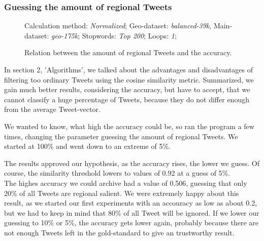 \documentclass[../Main.tex]{subfiles}
\begin{document}
\subsubsection{Guessing the amount of regional Tweets}
\begin{figure}
Calculation method: \textit{Normalized}; Geo-dataset: \textit{balanced-39k}, Main-dataset: \textit{geo-175k}; Stopwords: \textit{Top 200}; Loops: \textit{1}; 

  \caption{Relation between the amount of regional Tweets and the accuracy.}
  \label{geo_graph2}
\end{figure}
In section 2, 'Algorithms', we talked about the advantages and disadvantages of filtering too ordinary Tweets using the cosine similarity metric. Summarized, we gain much better results, considering the accuracy, but have to accept, that we cannot classify a huge percentage of Tweets, because they do not differ enough from the average Tweet-vector.

We wanted to know, what high the accuracy could be, so ran the program a few times, changing the parameter guessing the amount of regional Tweets. We started at 100\% and went down to an extreme of 5\%.

The results approved our hypothesis, as the accuracy rises, the lower we guess. Of course, the similarity threshold lowers to values of 0.92 at a guess of 5\%. \\
The highes accuracy we could archive had a value of 0.506, guessing that only 20\% of all Tweets are regional salient. We were extremely happy about this result, as we started our first experiments with an accouracy as low as about 0.2, but we had to keep in mind that 80\% of all Tweet will be ignored. If we lower our guessing to 10\% or 5\%, the accuracy gets lower again, probably because there are not enough Tweets left in the gold-standard to give an trustworthy result. 
\end{document}
